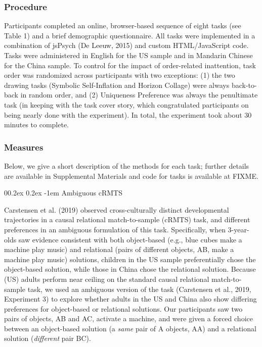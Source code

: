 \documentclass[
  man]{apa6}
\makeatletter
\let\oldparagraph\paragraph
\renewcommand{\paragraph}[1]{\oldparagraph{#1}\mbox{}}
\renewcommand{\paragraph}{\@startsection{paragraph}{4}{\parindent}%
  {0\baselineskip \@plus 0.2ex \@minus 0.2ex}%
  {-1em}%
  {\normalfont\normalsize\bfseries\itshape\typesectitle}}
\makeatother
\begin{document}
\hypertarget{procedure}{%
\subsubsection{Procedure}\label{procedure}}

Participants completed an online, browser-based sequence of eight tasks (see Table 1) and a brief demographic questionnaire. All tasks were implemented in a combination of jsPsych (De Leeuw, 2015) and custom HTML/JavaScript code. Tasks were administered in English for the US sample and in Mandarin Chinese for the China sample. To control for the impact of order-related inattention, task order was randomized across participants with two exceptions: (1) the two drawing tasks (Symbolic Self-Inflation and Horizon Collage) were always back-to-back in random order, and (2) Uniqueness Preference was always the penultimate task (in keeping with the task cover story, which congratulated participants on being nearly done with the experiment). In total, the experiment took about 30 minutes to complete.

\hypertarget{measures}{%
\subsubsection{Measures}\label{measures}}

Below, we give a short description of the methods for each task; further details are available in Supplemental Materials and code for tasks is available at FIXME.

\hypertarget{ambiguous-crmts}{%
\paragraph{Ambiguous cRMTS}\label{ambiguous-crmts}}

Carstensen et al. (2019) observed cross-culturally distinct developmental trajectories in a causal relational match-to-sample (cRMTS) task, and different preferences in an ambiguous formulation of this task. Specifically, when 3-year-olds saw evidence consistent with both object-based (e.g., blue cubes make a machine play music) and relational (pairs of different objects, AB, make a machine play music) solutions, children in the US sample preferentially chose the object-based solution, while those in China chose the relational solution. Because (US) adults perform near ceiling on the standard causal relational match-to-sample task, we used an ambiguous version of the task (Carstensen et al., 2019, Experiment 3) to explore whether adults in the US and China also show differing preferences for object-based or relational solutions. Our participants saw two pairs of objects, AB and AC, activate a machine, and were given a forced choice between an object-based solution (a \emph{same} pair of A objects, AA) and a relational solution (\emph{different} pair BC).
\end{document}
